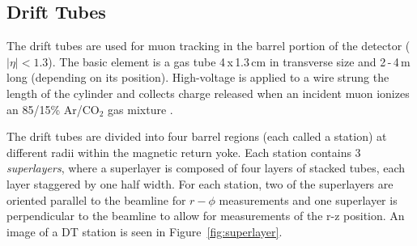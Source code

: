\subsection{Drift Tubes}

The drift tubes are used for muon tracking in the barrel portion of the detector ($|\eta|<1.3$). The basic element is a gas tube 4$\,$x$\,$1.3$\,$cm in transverse size and 2$\,$-$\,$4$\,$m long (depending on its position). High-voltage is applied to a wire strung the length of the cylinder and collects charge released when an incident muon ionizes an 85/15\% Ar/CO$_{2}$ gas mixture \cite{dtperformance}.

The drift tubes are divided into four barrel regions (each called a station) at different radii within the magnetic return yoke. Each station contains 3 \textit{superlayers}, where a superlayer is composed of four layers of stacked tubes, each layer staggered by one half width. For each station, two of the superlayers are oriented parallel to the beamline for $r-\phi$ measurements and one superlayer is perpendicular to the beamline to allow for measurements of the r-z position. An image of a DT station is seen in Figure~\ref{fig:superlayer}.

